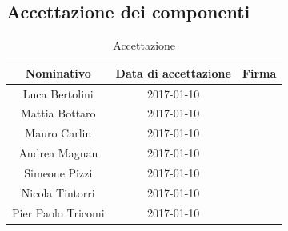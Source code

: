 \documentclass[a4paper,titlepage]{article}
\begin{document}
\subsection{Accettazione dei componenti}
\begin{table}[htbp]
	\begin{center}
		\setlength{\extrarowheight}{\jot}
		\begin{tabular}{|c|c|p{6cm}|}
			\hline
			\textbf{Nominativo} & \textbf{Data di accettazione} & \textbf{Firma} \\[1ex]
			\hline
			Luca Bertolini	&	2017-01-10	& \\[4ex]
			\hline
			Mattia Bottaro		&	2017-01-10	& \\[4ex]
			\hline
			Mauro Carlin	&	2017-01-10	& \\[4ex]
			\hline
			Andrea Magnan	&	2017-01-10	& \\[4ex]
			\hline
			Simeone Pizzi	&	2017-01-10	& \\[4ex]
			\hline
			Nicola Tintorri	&	2017-01-10	& \\[4ex]
			\hline
			Pier Paolo Tricomi	&	2017-01-10	& \\[4ex]
			\hline
		\end{tabular}
	\end{center}
	\caption{Accettazione}
\end{table}
\end{document}

